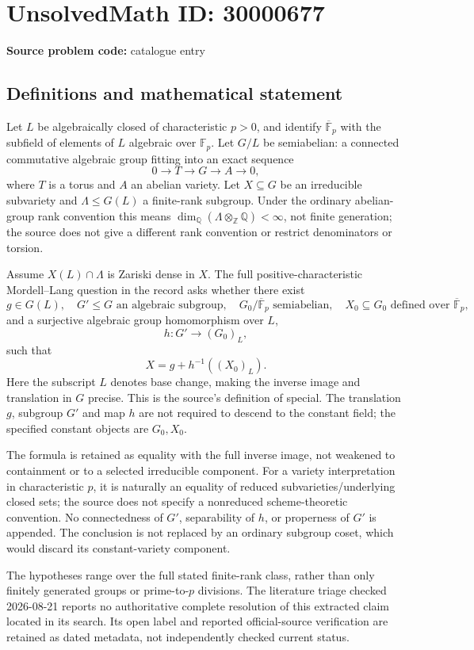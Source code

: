 \documentclass[11pt]{article}
\newcommand{\Z}{\mathbb{Z}}
\newcommand{\Q}{\mathbb{Q}}
\newcommand{\F}{\mathbb{F}}
\begin{document}
\section*{UnsolvedMath ID: 30000677}
\textbf{Source problem code:} catalogue entry
\subsection{Definitions and mathematical statement}
Let \(L\) be algebraically closed of characteristic \(p>0\), and identify \(\overline{\F}_p\) with the subfield of elements of \(L\) algebraic over \(\F_p\). Let \(G/L\) be semiabelian: a connected commutative algebraic group fitting into an exact sequence
\[
 0\longrightarrow T\longrightarrow G\longrightarrow A\longrightarrow0,
\]
where \(T\) is a torus and \(A\) an abelian variety. Let \(X\subseteq G\) be an irreducible subvariety and \(\Lambda\leq G(L)\) a finite-rank subgroup. Under the ordinary abelian-group rank convention this means \(\dim_\Q(\Lambda\otimes_\Z\Q)<\infty\), not finite generation; the source does not give a different rank convention or restrict denominators or torsion.

Assume \(X(L)\cap\Lambda\) is Zariski dense in \(X\). The full positive-characteristic Mordell--Lang question in the record asks whether there exist
\[
 g\in G(L),\quad G'\leq G\text{ an algebraic subgroup},\quad
 G_0/\overline{\F}_p\text{ semiabelian},\quad
 X_0\subseteq G_0\text{ defined over }\overline{\F}_p,
\]
and a surjective algebraic group homomorphism over \(L\),
\[
 h:G'\longrightarrow (G_0)_L,
\]
such that
\[
 X=g+h^{-1}((X_0)_L).
\]
Here the subscript \(L\) denotes base change, making the inverse image and translation in \(G\) precise. This is the source's definition of special. The translation \(g\), subgroup \(G'\) and map \(h\) are not required to descend to the constant field; the specified constant objects are \(G_0,X_0\).

The formula is retained as equality with the full inverse image, not weakened to containment or to a selected irreducible component. For a variety interpretation in characteristic \(p\), it is naturally an equality of reduced subvarieties/underlying closed sets; the source does not specify a nonreduced scheme-theoretic convention. No connectedness of \(G'\), separability of \(h\), or properness of \(G'\) is appended. The conclusion is not replaced by an ordinary subgroup coset, which would discard its constant-variety component.

The hypotheses range over the full stated finite-rank class, rather than only finitely generated groups or prime-to-\(p\) divisions. The literature triage checked 2026-08-21 reports no authoritative complete resolution of this extracted claim located in its search. Its open label and reported official-source verification are retained as dated metadata, not independently checked current status.
\end{document}
